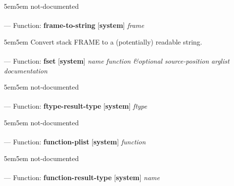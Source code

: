 \begin{adjustwidth}{5em}{5em}
not-documented
\end{adjustwidth}

\paragraph{}
\label{SYSTEM:FRAME-TO-STRING}
--- Function: \textbf{frame-to-string} [\textbf{system}] \textit{frame}

\begin{adjustwidth}{5em}{5em}
Convert stack FRAME to a (potentially) readable string.
\end{adjustwidth}

\paragraph{}
\label{SYSTEM:FSET}
--- Function: \textbf{fset} [\textbf{system}] \textit{name function \&optional source-position arglist documentation}

\begin{adjustwidth}{5em}{5em}
not-documented
\end{adjustwidth}

\paragraph{}
\label{SYSTEM:FTYPE-RESULT-TYPE}
--- Function: \textbf{ftype-result-type} [\textbf{system}] \textit{ftype}

\begin{adjustwidth}{5em}{5em}
not-documented
\end{adjustwidth}

\paragraph{}
\label{SYSTEM:FUNCTION-PLIST}
--- Function: \textbf{function-plist} [\textbf{system}] \textit{function}

\begin{adjustwidth}{5em}{5em}
not-documented
\end{adjustwidth}

\paragraph{}
\label{SYSTEM:FUNCTION-RESULT-TYPE}
--- Function: \textbf{function-result-type} [\textbf{system}] \textit{name}


